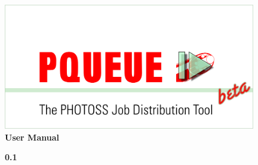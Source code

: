 
\usepackage{tikz}
\usetikzlibrary{snakes}
\usepackage{PScript}
\usepackage{PQueueScript}

\newcommand{\photoss}{\PHO{}}
\newcommand{\pjob}{\PJOB{}}
\newcommand{\matlab}{\Matt{}}
\newcommand{\pho}{.pho}
\newcommand{\pscript}{.pscript}
\newcommand{\pjobeditor}{\mbox{PJobEditor}}
\newcommand{\mac}{\mbox{MacOSX\textsuperscript{\textregistered}}}

\makeindex



	\begin{titlepage}

	\vspace*{2cm}

	\begin{center}
		\includegraphics[width=11.00cm]{../src/PQueue/Resources/splash_gross.png}\\
		\vspace*{3cm}
	 \Huge{  \textcolor{phocolor}{\textbf{User Manual}}}\\
	\end{center}

	\vspace{1cm} 
	\begin{center}
	\textcolor{phocolor}{\textbf{\Huge \PQUEUE{} 0.1}}
	\end{center}

	\end{titlepage}

\newpage 
\pagestyle{empty}


